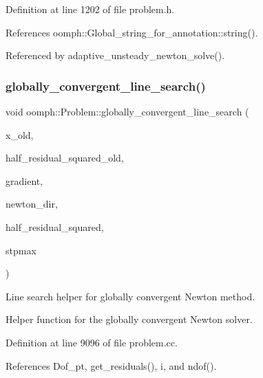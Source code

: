 Definition at line 1202 of file problem.\+h.



References oomph\+::\+Global\+\_\+string\+\_\+for\+\_\+annotation\+::string().



Referenced by adaptive\+\_\+unsteady\+\_\+newton\+\_\+solve().

\mbox{\label{classoomph_1_1Problem_ac60d7455a13ee171060c3a81623840b2}} 
\subsubsection{\texorpdfstring{globally\+\_\+convergent\+\_\+line\+\_\+search()}{globally\_convergent\_line\_search()}}
{\footnotesize\ttfamily void oomph\+::\+Problem\+::globally\+\_\+convergent\+\_\+line\+\_\+search (\begin{DoxyParamCaption}\item[{const \hyperlink{classoomph_1_1Vector}{Vector}$<$ double $>$ \&}]{x\+\_\+old,  }\item[{const double \&}]{half\+\_\+residual\+\_\+squared\+\_\+old,  }\item[{\hyperlink{classoomph_1_1DoubleVector}{Double\+Vector} \&}]{gradient,  }\item[{\hyperlink{classoomph_1_1DoubleVector}{Double\+Vector} \&}]{newton\+\_\+dir,  }\item[{double \&}]{half\+\_\+residual\+\_\+squared,  }\item[{const double \&}]{stpmax }\end{DoxyParamCaption})\hspace{0.3cm}{\ttfamily [private]}}



Line search helper for globally convergent Newton method. 

Helper function for the globally convergent Newton solver. 

Definition at line 9096 of file problem.\+cc.



References Dof\+\_\+pt, get\+\_\+residuals(), i, and ndof().



